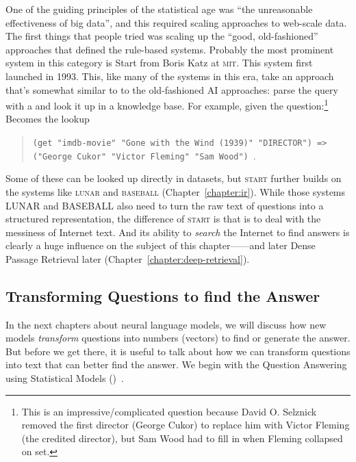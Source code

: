 One of the guiding principles of the statistical age was ``the
unreasonable effectiveness of big data'', and this required scaling 
approaches to web-scale data.
%
The first things that people tried was scaling up the ``good,
old-fashioned'' approaches that defined the rule-based systems.
%
Probably the most prominent system in this category is Start from Boris Katz
at \textsc{mit}.  This system first launched in 1993.
%
This, like many of the systems in
this era, take an approach that’s somewhat similar to to the old-fashioned AI
approaches: parse the query with a and look it up in a knowledge base.
%
For example, given the question:\footnote{This is an impressive/complicated question
    because David O. Selznick removed the first director (George Cukor) to
    replace him with Victor Fleming (the credited director), but Sam Wood had
    to fill in when Fleming collapsed on set.}
%
%
Becomes the lookup
\begin{quote}
  \texttt{(get "imdb-movie" "Gone with the Wind (1939)" "DIRECTOR") =>
    ("George Cukor" "Victor Fleming" "Sam Wood")}~\citep{katz-02}.
\end{quote}
%
Some of these can be looked up directly in datasets, but \textsc{start}
further builds on the systems like \textsc{lunar} and \textsc{baseball}
(Chapter~\ref{chapter:ir}).
%
While those systems LUNAR and
BASEBALL also need to turn the raw text of questions into a structured
representation, the difference of \textsc{start} is that
is to deal with the
messiness of Internet text.
%
And its ability to \emph{search} the
Internet to find answers is clearly a huge influence on the subject of this
chapter---\watson{}---and later Dense Passage
Retrieval later (Chapter~\ref{chapter:deep-retrieval}).

\subsection{Transforming Questions to find the Answer}


In the next chapters about neural language models, we will discuss how new
models \emph{transform} questions into numbers (vectors) to find or generate
the answer.
%
But before we get there, it is useful to talk about how we can transform
questions into text that can better find the answer.
%
We begin with the Question Answering using Statistical Models ()~\citep{radev-01}.

